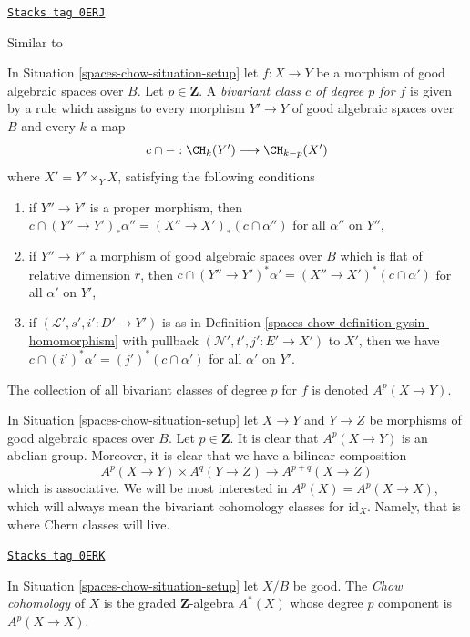 \begin{definition}
\label{spaces-chow-definition-bivariant-class}
\href{https://stacks.math.columbia.edu/tag/0ERJ}{\texttt{Stacks tag 0ERJ}}

\begin{reference}
Similar to \cite[Definition 17.1]{F}
\end{reference}
In Situation \ref{spaces-chow-situation-setup} let $f : X \to Y$ be a morphism of
good algebraic spaces over $B$. Let $p \in \mathbf{Z}$.
A {\it bivariant class $c$ of degree $p$ for $f$} is given by a rule
which assigns to every morphism $Y' \to Y$ of good algebraic spaces over $B$
and every $k$ a map
$$
c \cap - : \CH_k(Y') \longrightarrow \CH_{k - p}(X')
$$
where $X' = Y' \times_Y X$, satisfying the following conditions
\begin{enumerate}
\item if $Y'' \to Y'$ is a proper morphism, then
$c \cap (Y'' \to Y')_*\alpha'' = (X'' \to X')_*(c \cap \alpha'')$
for all $\alpha''$ on $Y''$,
\item if $Y'' \to Y'$ a morphism of good algebraic spaces over $B$
which is flat of relative dimension $r$, then
$c \cap (Y'' \to Y')^*\alpha' = (X'' \to X')^*(c \cap \alpha')$
for all $\alpha'$ on $Y'$,
\item if $(\mathcal{L}', s', i' : D' \to Y')$ is as in
Definition \ref{spaces-chow-definition-gysin-homomorphism}
with pullback $(\mathcal{N}', t', j' : E' \to X')$ to $X'$,
then we have $c \cap (i')^*\alpha' = (j')^*(c \cap \alpha')$
for all $\alpha'$ on $Y'$.
\end{enumerate}
The collection of all bivariant classes of degree $p$ for $f$ is
denoted $A^p(X \to Y)$.
\end{definition}

In Situation \ref{spaces-chow-situation-setup} let $X \to Y$ and $Y \to Z$
be morphisms of good algebraic spaces over $B$. Let $p \in \mathbf{Z}$.
It is clear that $A^p(X \to Y)$ is an abelian group.
Moreover, it is clear that we have a bilinear composition
$$
A^p(X \to Y) \times A^q(Y \to Z) \to A^{p + q}(X \to Z)
$$
which is associative.
We will be most interested in $A^p(X) = A^p(X \to X)$, which will always mean
the bivariant cohomology classes for $\text{id}_X$. Namely, that is where
Chern classes will live.

\begin{definition}
\label{spaces-chow-definition-chow-cohomology}
\href{https://stacks.math.columbia.edu/tag/0ERK}{\texttt{Stacks tag 0ERK}}

In Situation \ref{spaces-chow-situation-setup} let $X/B$ be good. The {\it Chow cohomology}
of $X$ is the graded $\mathbf{Z}$-algebra $A^*(X)$ whose degree
$p$ component is $A^p(X \to X)$.
\end{definition}

